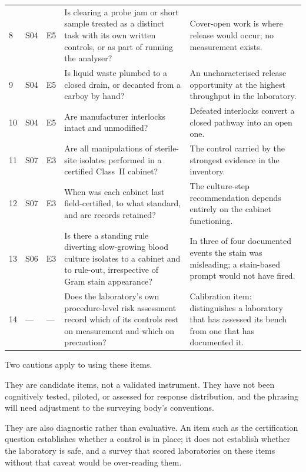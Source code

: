 \begin{table}[t]
\begin{tabular}{@{}p{} p{} p{} p{} p{}@{}}
8 & S04 & E5 & Is clearing a probe jam or short sample treated as a distinct
task with its own written controls, or as part of running the analyser? &
Cover-open work is where release would occur; no measurement exists. \\

9 & S04 & E5 & Is liquid waste plumbed to a closed drain, or decanted from a
carboy by hand? & An uncharacterised release opportunity at the highest
throughput in the laboratory. \\

10 & S04 & E5 & Are manufacturer interlocks intact and unmodified? &
Defeated interlocks convert a closed pathway into an open one. \\

11 & S07 & E3 & Are all manipulations of sterile-site isolates performed in a
certified Class~II cabinet? & The control carried by the strongest evidence in
the inventory. \\

12 & S07 & E3 & When was each cabinet last field-certified, to what standard,
and are records retained? & The culture-step recommendation depends entirely
on the cabinet functioning. \\

13 & S06 & E3 & Is there a standing rule diverting slow-growing blood culture
isolates to a cabinet and to rule-out, irrespective of Gram stain appearance? &
In three of four documented events the stain was misleading; a stain-based
prompt would not have fired. \\

14 & --- & --- & Does the laboratory's own procedure-level risk assessment
record which of its controls rest on measurement and which on precaution? &
Calibration item: distinguishes a laboratory that has assessed its bench from
one that has documented it. \\
\bottomrule
\end{tabular}
\end{table}

Two cautions apply to using these items.

They are candidate items, not a validated instrument. They have not been
cognitively tested, piloted, or assessed for response distribution, and the
phrasing will need adjustment to the surveying body's conventions.

They are also diagnostic rather than evaluative. An item such as the
certification question establishes whether a control is in place; it does not
establish whether the laboratory is safe, and a survey that scored laboratories
on these items without that caveat would be over-reading them.

